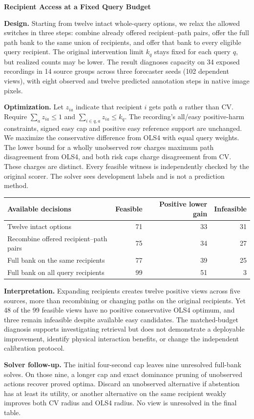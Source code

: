 \documentclass[10pt,letterpaper]{article}
\begin{document}
{\Large\bfseries Recipient Access at a Fixed Query Budget}

\textbf{Design.} Starting from twelve intact whole-query options,
we relax the allowed switches in three steps: combine already
offered recipient--path pairs, offer the full path bank to the same
union of recipients, and offer that bank to every eligible query
recipient. The original intervention limit $k_q$ stays fixed for
each query $q$, but realized counts may be lower. The result diagnoses
capacity on 34 exposed recordings in 14 source groups across three
forecaster seeds (102 dependent views), with eight observed and
twelve predicted annotation steps in native image pixels.

\textbf{Optimization.} Let $z_{ia}$ indicate that recipient $i$ gets
path $a$ rather than CV. Require $\sum_a z_{ia}\leq 1$ and
$\sum_{i\in q,a}z_{ia}\leq k_q$. The recording's all/easy positive-harm
constraints, signed easy cap and positive easy reference support are
unchanged. We maximize the conservative difference from OLS4 with
equal query weights. The lower bound for a wholly unobserved row
charges maximum path disagreement from OLS4, and both risk caps
charge disagreement from CV. These charges are distinct. Every
feasible witness is independently checked by the original scorer.
The solver sees development labels and is not a prediction method.

\begin{center}
\begin{tabular}{@{}lrrr@{}}
\toprule
Available decisions & Feasible & Positive lower gain & Infeasible \\
\midrule
Twelve intact options & 71 & 33 & 31 \\
Recombine offered recipient--path pairs & 75 & 34 & 27 \\
Full bank on the same recipients & 77 & 39 & 25 \\
Full bank on all query recipients & 99 & 51 & 3 \\
\bottomrule
\end{tabular}
\end{center}

\textbf{Interpretation.} Expanding recipients creates twelve positive
views across five sources, more than recombining or changing paths
on the original recipients. Yet 48 of the 99 feasible views have no
positive conservative OLS4 optimum, and three remain infeasible
despite available easy candidates. The matched-budget diagnosis
supports investigating retrieval but does not demonstrate a
deployable improvement, identify physical interaction benefits, or
change the independent calibration protocol.

\textbf{Solver follow-up.} The initial four-second cap leaves nine
unresolved full-bank solves. On those nine, a longer cap and exact
dominance pruning of unobserved actions recover proved optima.
Discard an unobserved alternative if abstention has at least its
utility, or another alternative on the same recipient weakly
improves both CV radius and OLS4 radius. No view is unresolved in
the final table.
\end{document}
